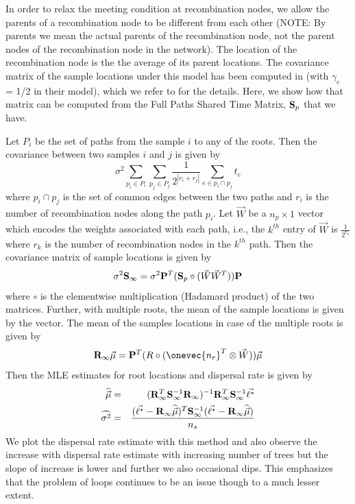 \label{appendix:RelaxedBM}
In order to relax the meeting condition at recombination nodes, we allow the parents of a recombination node to be different from each other (NOTE: By parents we mean the actual parents of the recombination node, not the parent nodes of the recombination node in the network). The location of the recombination node is the the average of its parent locations. 
The covariance matrix of the sample locations under this model has been computed in \cite{Bastide2018} (with $\gamma_e$ = 1/2 in their model), which we refer to for the details. Here, we show how that matrix can be computed from the Full Paths Shared Time Matrix, $\mathbf{S}_p$ that we have. 

Let $P_i$ be the set of paths from the sample $i$ to any of the roots. Then the covariance between two samples $i$ and $j$ is given by
\begin{equation}
    \displaystyle \sigma^2 \sum_{p_i \in P_i} \sum_{p_j \in P_j} \frac{1}{2^{|r_i+r_j|}} \sum_{e \in p_i \cap p_j} t_e
\end{equation}
where $p_i \cap p_j$ is the set of common edges between the two paths and $r_i$ is the number of recombination nodes along the path $p_i$. 
Let $\Vec{W}$ be a $n_p \times 1$ vector which encodes the weights associated with each path, i.e., the $k^{th}$ entry of $\vec{W}$ is $\displaystyle \frac{1}{2^{r_k}}$ where $r_k$ is the number of recombination nodes in the $k^{th}$ path. Then the covariance matrix of sample locations is given by
\begin{equation}
\sigma^2\mathbf{S_\infty} = \sigma^2\mathbf{P}^T(\mathbf{S}_p \circ (\Vec{W}\Vec{W}^T))\mathbf{P}
\end{equation}
where $\circ$ is the elementwise multiplication (Hadamard product) of the two matrices. Further, with multiple roots, the mean of the sample locations is given by the vector. The mean of the samples locations in case of the multiple roots is given by 
\begin{equation}
    \mathbf{R}_\infty\muvec = \Pp^T(R \circ (\onevec{{n_r}}^T \otimes \vec{W} )) \muvec
\end{equation}
Then the MLE estimates for root locations and dispersal rate is given by
\begin{eqnarray}
    \widehat{\vec{\mu}} &=& (\mathbf{R}_\infty^T \mathbf{S}_\infty^{-1} \mathbf{R}_\infty)^{-1} \mathbf{R}_\infty^T \mathbf{S}_\infty^{-1} \vec{\ell^*} \\
    \widehat{\sigma^2} &=& \frac{(\vec{\ell^*} - \mathbf{R}_\infty\widehat{\vec{\mu}} )^T\mathbf{S}_\infty^{-1}(\vec{\ell^*} - \mathbf{R}_\infty\widehat{\vec{\mu}} )}{n_s}
\end{eqnarray}
We plot the dispersal rate estimate with this method and also observe the increase with dispersal rate estimate with increasing number of trees but the slope of increase is lower and further we also occasional dips. This emphasizes that the problem of loops continues to be an issue though to a much lesser extent.

